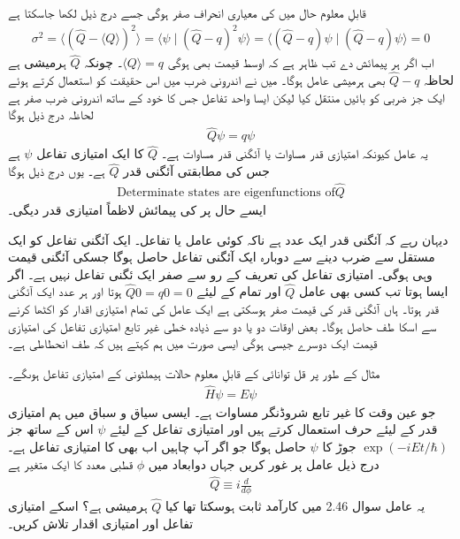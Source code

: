 قابلِ معلوم حال میں  کی معیاری انحراف صفر ہوگی جسے درج ذیل لکھا جاسکتا ہے
\begin{align}
	\sigma^{2} = \langle (\hat{Q}-\langle Q \rangle)^{2} \rangle = \langle \psi\mid(\hat{Q}-q)^{2}\psi \rangle = \langle (\hat{Q}-q)\psi\mid(\hat{Q}-q)\psi \rangle = 0
\end{align}
اب اگر ہر پیمائش  دے تب ظاہر ہے کہ اوسط قیمت بھی  ہوگی \(\langle Q \rangle = q\)۔ چونکہ \(\hat{Q}\) ہرمیشی ہے لحاظہ \(\hat{Q}-q\) بھی ہرمیشی عامل ہوگا۔ میں نے اندرونی ضرب میں اس حقیقت کو استعمال کرتے ہوئے ایک جز ضربی کو بائیں منتقل کیا لیکن ایسا واحد تفاعل جس کا خود کے ساتھ اندرونی ضرب صفر ہے لحاظہ درج ذیل ہوگا
\begin{align}
	\hat{Q}\psi = q\psi
\end{align}
یہ عامل کیونکہ امتیازی قدر مساوات یا آئگنی قدر مساوات ہے۔ \(\hat{Q}\)  کا ایک امتیازی تفاعل \(\psi\) ہے جس کی مطابقتی آئگنی قدر \(\hat{Q}\) ہے۔ یوں درج ذیل ہوگا
\begin{align}
	\text{Determinate states are eigenfunctions of}\hat{Q}
\end{align}
ایسے حال پر  کی پیمائش لاظماً امتیازی قدر  دیگی۔

دیہان رہے کہ آئگنی قدر ایک عدد ہے ناکہ کوئی عامل یا تفاعل۔ ایک آئگنی تفاعل کو ایک مستقل سے ضرب دینے سے دوبارہ ایک آئگنی تفاعل حاصل ہوگا جسکی آئگنی قیمت وہی ہوگی۔ امتیازی تفاعل کی تعریف کے رو سے صفر ایک ئگنی تفاعل نہیں ہے۔ اگر ایسا ہوتا تب کسی بھی عامل \(\hat{Q}\) اور تمام  کے لیئے \(\hat{Q}0=q0=0\) ہوتا اور ہر عدد ایک آئگنی قدر ہوتا۔ ہاں آئگنی قدر کی قیمت صفر ہوسکتی ہے ایک عامل کی تمام امتیازی اقدار کو اکٹھا کرنے سے اسکا طف حاصل ہوگا۔ بعض اوقات دو یا دو سے ذیادہ خطی غیر تابع امتیازی تفاعل کی امتیازی قیمت ایک دوسرے جیسی ہوگی ایسی صورت میں ہم کہتے ہیں کہ طف انحطاطی ہے۔

مثال کے طور پر قل توانائی کے قابلِ معلوم حالات ہیملٹونی کے امتیازی تفاعل ہوںگے۔ 
\begin{align}
	\hat{H}\psi = E\psi
\end{align}
جو عین وقت کا غیر تابع شروڈنگر مساوات ہے۔ ایسی سیاق و سباق میں ہم امتیازی قدر کے لیئے حرف  استعمال کرتے ہیں اور امتیازی تفاعل کے لیئے \(\psi\) اس کے ساتھ جز \(\exp(-iEt/\hbar)\) جوڑ کا \(\psi\) حاصل ہوگا جو اگر آپ چاہیں اب بھی  کا امتیازی تفاعل ہے۔
درج ذیل عامل پر غور کریں جہاں دوابعاد میں \(\phi\) قطبی معدد کا ایک متغیر ہے
\begin{align}
	\hat{Q} \equiv i\frac{d}{d\phi}
\end{align}
یہ عامل سوال \num{2.46} میں کارآمد ثابت ہوسکتا تھا کیا \(\hat{Q}\) ہرمیشی ہے؟ اسکے امتیازی تفاعل اور امتیازی اقدار تلاش کریں۔

